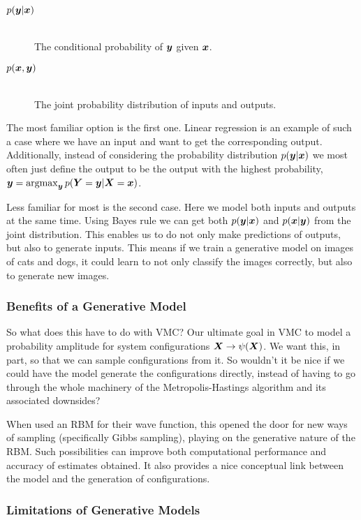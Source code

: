 \documentclass[Thesis.tex]{subfiles}
\begin{document}
\begin{description}
\item[$p(\bm{y} | \bm{x})$]\hfill\\
  The conditional probability of $\bm{y}$ given $\bm{x}$.
\item[$p(\bm{x}, \bm{y})$] \hfill\\
  The joint probability distribution of inputs and outputs.
\end{description}
The most familiar option is the first one. Linear regression is an example of
such a case where we have an input and want to get the corresponding output.
Additionally, instead of considering the probability distribution $p(\bm{y}|\bm{x})$ we
most often just define the output to be the output with the highest probability,
$\bm{y} = \operatorname*{argmax}_{\bm{y}}p(\bm{Y} = \bm{y} | \bm{X} = \bm{x})$.

Less familiar for most is the second case. Here we model both inputs and outputs
at the same time. Using Bayes rule we can get both $p(\bm{y}|\bm{x})$ and $p(\bm{x} |
\bm{y})$ from the joint distribution. This enables us to do not only make predictions of
outputs, but also to generate inputs. This means if we train a generative model
on images of cats and dogs, it could learn to not only classify the images
correctly, but also to generate new images.

\subsubsection{Benefits of a Generative Model}

So what does this have to do with VMC? Our ultimate
goal in VMC to model a probability amplitude for system configurations
$\bm{X}\rightarrow \psi(\bm{X})$. We want this, in part, so that we can sample
configurations from it. So wouldn't it be nice if we could have the model
generate the configurations directly, instead of having to go through the whole
machinery of the Metropolis-Hastings algorithm and its associated downsides?

When \textcite{Carleo602} used an RBM for their wave function, this opened the
door for new ways of sampling (specifically Gibbs sampling), playing on the
generative nature of the RBM. Such possibilities can improve both computational
performance and accuracy of estimates obtained. It also provides a nice
conceptual link between the model and the generation of configurations.

\subsubsection{Limitations of Generative Models}
\end{document}
